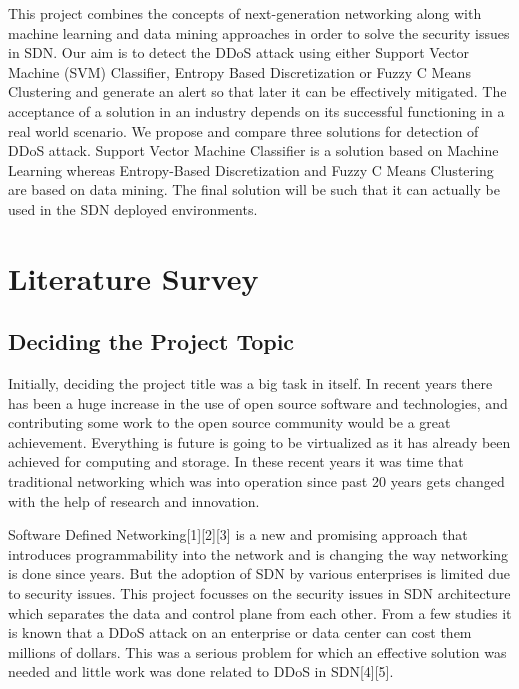 \documentclass[12pt,a4paper,final]{report}
\begin{document}
This project combines the concepts of next-generation networking along with machine learning and data mining approaches in order to solve the security issues in SDN. Our aim is to detect the DDoS attack using either Support Vector Machine (SVM) Classifier, Entropy Based Discretization or Fuzzy C Means Clustering and generate an alert so that later it can be effectively mitigated. The acceptance of a solution in an industry depends on its successful functioning in a real world scenario. We propose and compare three solutions for detection of DDoS attack. Support Vector Machine Classifier is a solution based on Machine Learning whereas Entropy-Based Discretization and Fuzzy C Means Clustering are based on data mining. The final solution will be such that it can actually be used in the SDN deployed environments.

\section{Literature Survey}
\subsection{Deciding the Project Topic}
Initially, deciding the project title was a big task in itself. In recent years there has been a huge increase in the use of open source software and technologies, and contributing some work to the open source community would be a great achievement. Everything is future is going to be virtualized as it has already been achieved for computing and storage. In these recent years it was time that traditional networking which was into operation since past 20 years gets changed with the help of research and innovation. 

Software Defined Networking[1][2][3] is a new and promising approach that introduces programmability into the network and is changing the way networking is done since years. But the adoption of SDN by various enterprises is limited due to security issues. This project focusses on the security issues in SDN architecture which separates the data and control plane from each other. From a few studies it is known that a DDoS attack on an enterprise or data center can cost them millions of dollars. This was a serious problem for which an effective solution was needed and little work was done related to DDoS in SDN[4][5].
\end{document}
